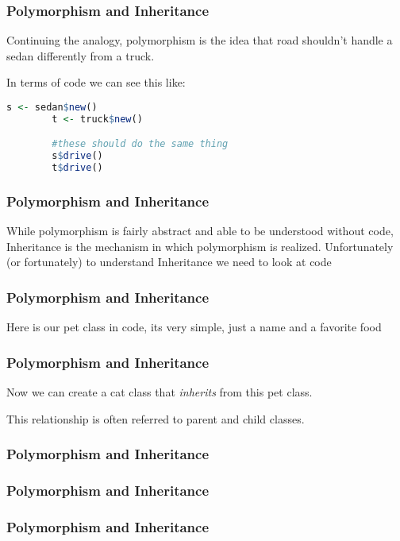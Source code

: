 \documentclass[professionalfont]{beamer}
\begin{document}
\begin{frame}[fragile]
    \frametitle{Polymorphism and Inheritance}
    Continuing the analogy, polymorphism is the idea that road shouldn't handle a sedan differently from a truck. \newline

    In terms of code we can see this like:
    \begin{lstlisting}[language=R]
        s <- sedan$new()
        t <- truck$new()

        #these should do the same thing
        s$drive()
        t$drive()
    \end{lstlisting}

\end{frame}
\begin{frame}
    \frametitle{Polymorphism and Inheritance}
    While polymorphism is fairly abstract and able to be understood without code, Inheritance is the mechanism in which polymorphism is realized. \newline
    Unfortunately (or fortunately) to understand Inheritance we need to look at code

\end{frame}


\begin{frame}[fragile]
    \frametitle{Polymorphism and Inheritance}
    Here is our pet class in code, its very simple, just a name and a favorite food
 
\end{frame}
\begin{frame}[fragile]
    \frametitle{Polymorphism and Inheritance}
    Now we can create a cat class that \textit{inherits} from this pet class.

    This relationship is often referred to parent and child classes.

 
\end{frame}

\begin{frame}[fragile]
    \frametitle{Polymorphism and Inheritance}

 
\end{frame}

\begin{frame}[fragile]
    \frametitle{Polymorphism and Inheritance}

 
\end{frame}
\begin{frame}[fragile]
    \frametitle{Polymorphism and Inheritance}

 
\end{frame}
\end{document}
